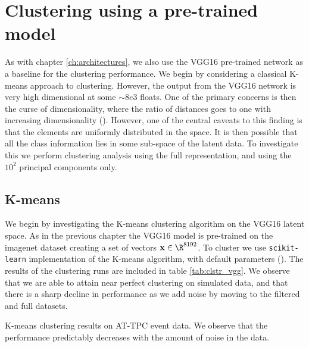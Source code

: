 \section{Clustering using a pre-trained model}\label{sec:vgg_cluster}

As with chapter \ref{ch:architectures}, we also use the VGG16 pre-trained network as a baseline for the clustering performance. We begin by considering a classical K-means approach to clustering. However, the output from the VGG16 network is very high dimensional at some $\sim 8e3$ floats. One of the primary concerns is then the curse of dimensionality, where the ratio of distances goes to one with increasing dimensionality (\cite{Aggarwal}). However, one of the central caveats to this finding is that the elements are uniformly distributed in the space. It is then possible that all the class information lies in some sub-space of the latent data. To investigate this we perform clustering analysis using the full representation, and using the $10^2$ principal components only. 

\subsection{K-means}

We begin by investigating the K-means clustering algorithm on the VGG16 latent space. As in the previous chapter the VGG16 model is pre-trained on the imagenet dataset creating a set of vectors $\mathbf{x} \in \R^{8192}$. To cluster we use \lstinline{scikit-learn} implementation of the K-means algorithm, with default parameters (\cite{Pedregosa2011}). The results of the clustering runs are included in table \ref{tab:clstr_vgg}. We observe  that we are able to attain near perfect clustering on simulated data, and that there is a sharp decline in performance as we add noise by moving to the filtered and full datasets. 

\begin{table}[H]
\centering 
\caption[K-means on pre-trained model]{K-means clustering results on AT-TPC event data. We observe that the performance predictably decreases with the amount of noise in the data.}\label{tab:clstr_vgg}

\end{table}

